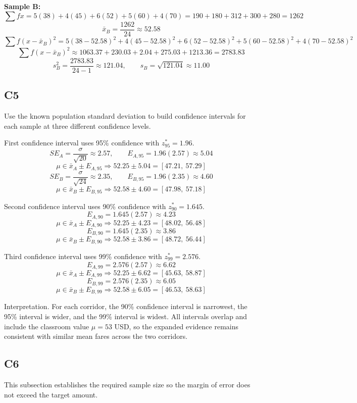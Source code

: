 \begin{ExamProblems}
		\textbf{Sample B:}
		\[
		\sum f x = 5(38) + 4(45) + 6(52) + 5(60) + 4(70) = 190 + 180 + 312 + 300 + 280 = 1262
		\]
		\[
		\bar{x}_B = \frac{1262}{24} \approx 52.58
		\]
		\[
		\sum f(x-\bar{x}_B)^2 = 5(38-52.58)^2 + 4(45-52.58)^2 + 6(52-52.58)^2 + 5(60-52.58)^2 + 4(70-52.58)^2
		\]
		\[
		\sum f(x-\bar{x}_B)^2 \approx 1063.37 + 230.03 + 2.04 + 275.03 + 1213.36 = 2783.83
		\]
		\[
		s_B^2 = \frac{2783.83}{24-1} \approx 121.04, \qquad s_B = \sqrt{121.04} \approx 11.00
		\]
		
		\subsection*{C5}
		Use the known population standard deviation to build confidence intervals for each sample at three different confidence levels.
		
		First confidence interval uses 95\% confidence with $z^*_{95} = 1.96$.
		\[
		SE_A = \frac{\sigma}{\sqrt{20}} \approx 2.57, \qquad E_{A,95} = 1.96(2.57) \approx 5.04
		\]
		\[
		\mu \in \bar{x}_A \pm E_{A,95} \Rightarrow 52.25 \pm 5.04 = [47.21,\ 57.29]
		\]
		\[
		SE_B = \frac{\sigma}{\sqrt{24}} \approx 2.35, \qquad E_{B,95} = 1.96(2.35) \approx 4.60
		\]
		\[
		\mu \in \bar{x}_B \pm E_{B,95} \Rightarrow 52.58 \pm 4.60 = [47.98,\ 57.18]
		\]
		
		Second confidence interval uses 90\% confidence with $z^*_{90} = 1.645$.
		\[
		E_{A,90} = 1.645(2.57) \approx 4.23
		\]
		\[
		\mu \in \bar{x}_A \pm E_{A,90} \Rightarrow 52.25 \pm 4.23 = [48.02,\ 56.48]
		\]
		\[
		E_{B,90} = 1.645(2.35) \approx 3.86
		\]
		\[
		\mu \in \bar{x}_B \pm E_{B,90} \Rightarrow 52.58 \pm 3.86 = [48.72,\ 56.44]
		\]
		
		Third confidence interval uses 99\% confidence with $z^*_{99} = 2.576$.
		\[
		E_{A,99} = 2.576(2.57) \approx 6.62
		\]
		\[
		\mu \in \bar{x}_A \pm E_{A,99} \Rightarrow 52.25 \pm 6.62 = [45.63,\ 58.87]
		\]
		\[
		E_{B,99} = 2.576(2.35) \approx 6.05
		\]
		\[
		\mu \in \bar{x}_B \pm E_{B,99} \Rightarrow 52.58 \pm 6.05 = [46.53,\ 58.63]
		\]
		
		Interpretation.
		For each corridor, the 90\% confidence interval is narrowest, the 95\% interval is wider, and the 99\% interval is widest.
		All intervals overlap and include the classroom value $\mu = 53$ USD, so the expanded evidence remains consistent with similar mean fares across the two corridors.
		
		\subsection*{C6}
		This subsection establishes the required sample size so the margin of error does not exceed the target amount.
		

\end{ExamProblems}
